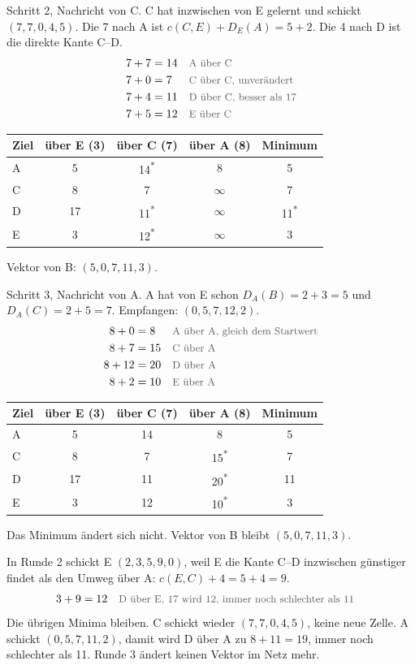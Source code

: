 \documentclass[a4paper,11pt]{article}
\newcommand{\why}[1]{\text{\small\color{black!65}#1}}
\newcommand{\stern}{\textsuperscript{*}}
\begin{document}
Schritt 2, Nachricht von C. C hat inzwischen von E gelernt und schickt \((7,7,0,4,5)\). Die 7 nach A ist \(c(C,E)+D_E(A)=5+2\). Die 4 nach D ist die direkte Kante C--D.
\begin{align*}
7+7 &= 14 && \why{A über C}\\
7+0 &= 7 && \why{C über C, unverändert}\\
7+4 &= 11 && \why{D über C, besser als 17}\\
7+5 &= 12 && \why{E über C}
\end{align*}
\begin{center}
\begin{tabular}{@{}lcccc@{}}
\toprule
Ziel & über E (3) & über C (7) & über A (8) & Minimum \\
\midrule
A & 5 & 14\stern & 8 & 5 \\
C & 8 & 7 & \(\infty\) & 7 \\
D & 17 & 11\stern & \(\infty\) & 11\stern \\
E & 3 & 12\stern & \(\infty\) & 3 \\
\bottomrule
\end{tabular}
\end{center}
Vektor von B: \((5,0,7,11,3)\).

Schritt 3, Nachricht von A. A hat von E schon \(D_A(B)=2+3=5\) und \(D_A(C)=2+5=7\). Empfangen: \((0,5,7,12,2)\).
\begin{align*}
8+0 &= 8 && \why{A über A, gleich dem Startwert}\\
8+7 &= 15 && \why{C über A}\\
8+12 &= 20 && \why{D über A}\\
8+2 &= 10 && \why{E über A}
\end{align*}
\begin{center}
\begin{tabular}{@{}lcccc@{}}
\toprule
Ziel & über E (3) & über C (7) & über A (8) & Minimum \\
\midrule
A & 5 & 14 & 8 & 5 \\
C & 8 & 7 & 15\stern & 7 \\
D & 17 & 11 & 20\stern & 11 \\
E & 3 & 12 & 10\stern & 3 \\
\bottomrule
\end{tabular}
\end{center}
Das Minimum ändert sich nicht. Vektor von B bleibt \((5,0,7,11,3)\).

In Runde 2 schickt E \((2,3,5,9,0)\), weil E die Kante C--D inzwischen günstiger findet als den Umweg über A: \(c(E,C)+4=5+4=9\).
\begin{align*}
3+9 &= 12 && \why{D über E, 17 wird 12, immer noch schlechter als 11}
\end{align*}
Die übrigen Minima bleiben. C schickt wieder \((7,7,0,4,5)\), keine neue Zelle. A schickt \((0,5,7,11,2)\), damit wird D über A zu \(8+11=19\), immer noch schlechter als 11. Runde 3 ändert keinen Vektor im Netz mehr.
\end{document}
